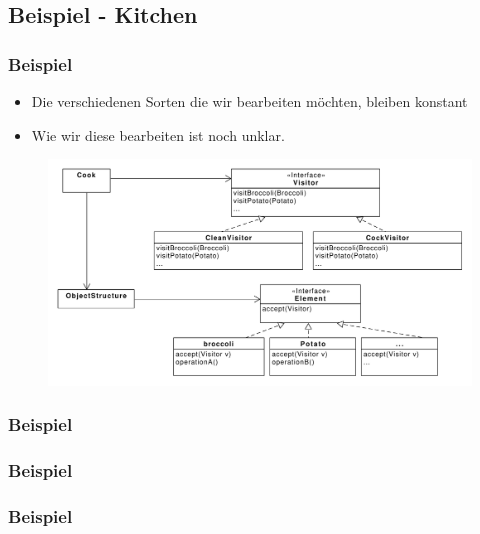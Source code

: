 \subsection{Beispiel - Kitchen}
\begin{frame}
	\frametitle{Beispiel}
	\begin{itemize}
		\item Die verschiedenen Sorten die wir bearbeiten möchten, bleiben konstant
		\item Wie wir diese bearbeiten ist noch unklar.
	\end{itemize}	
	
  	\begin{figure}
		\includegraphics[scale=.3]{paper/visitor/kitchen}
	\end{figure}
\end{frame}



\begin{frame}
	\frametitle{Beispiel}
  	\begin{figure}
	\end{figure}
\end{frame}

\begin{frame}
	\frametitle{Beispiel}
  	\begin{figure}
	\end{figure}
\end{frame}

\begin{frame}
	\frametitle{Beispiel}
  	\begin{figure}
	\end{figure}
\end{frame}

